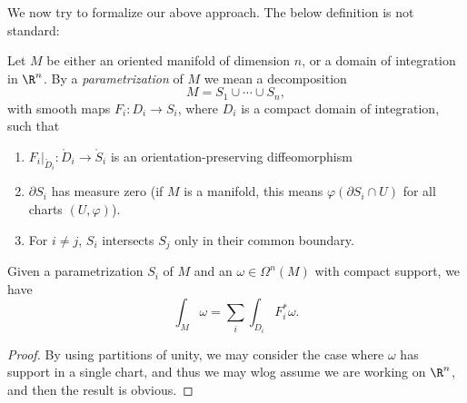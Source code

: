 \documentclass[a4paper]{article}
\begin{document}
We now try to formalize our above approach. The below definition is not standard:
\begin{defi}[Parametrization]
  Let $M$ be either an oriented manifold of dimension $n$, or a domain of integration in $\R^n$. By a \emph{parametrization} of $M$ we mean a decomposition
  \[
    M = S_1 \cup \cdots \cup S_n,
  \]
  with smooth maps $F_i: D_i \to S_i$, where $D_i$ is a compact domain of integration, such that
  \begin{enumerate}
    \item $F_i|_{\mathring{D}_i}: \mathring{D}_i \to \mathring{S}_i$ is an orientation-preserving diffeomorphism
    \item $\partial S_i$ has measure zero (if $M$ is a manifold, this means $\varphi(\partial S_i \cap U)$ for all charts $(U, \varphi)$).
    \item For $i \not= j$, $S_i$ intersects $S_j$ only in their common boundary.
  \end{enumerate}
\end{defi}

\begin{thm}
  Given a parametrization $S_i$ of $M$ and an $\omega \in \Omega^n(M)$ with compact support, we have
  \[
    \int_M \omega = \sum_i \int_{D_i} F_i^* \omega.
  \]
\end{thm}

\begin{proof}

  By using partitions of unity, we may consider the case where $\omega$ has support in a single chart, and thus we may wlog assume we are working on $\R^n$, and then the result is obvious.
\end{proof}
\end{document}
